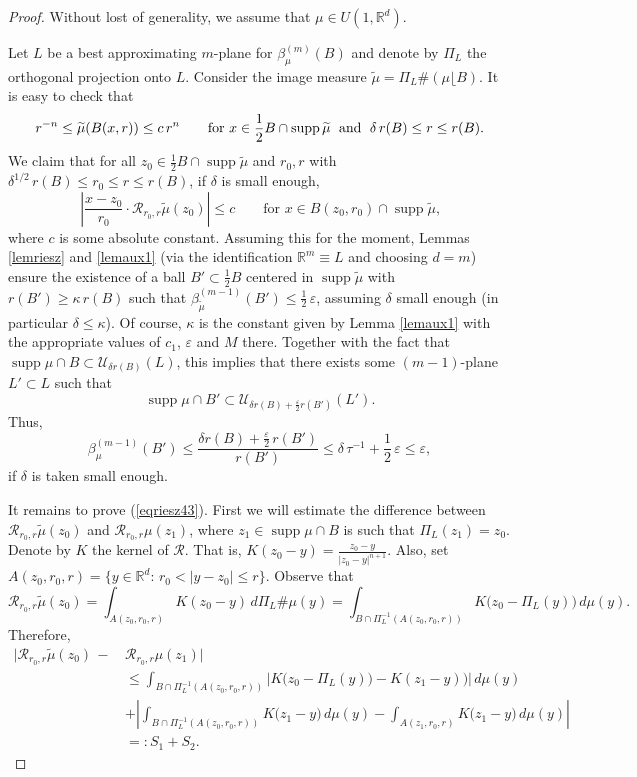 \documentclass[11pt]{amsart}
\newcommand{\R}{{\mathbb R}}       %
\newcommand{\UU}{{\mathcal U}}
\newcommand{\RR}{{\mathcal R}}
\newcommand{\rf}[1]{{(\ref{#1})}}
\newcommand{\supp}{\operatorname{supp}}
\newcommand{\ve}{{\varepsilon}}
\newcommand{\wt}[1]{{\widetilde{#1}}}
\newcommand{\rest}{{\lfloor}}
\theoremstyle{definition}
\theoremstyle{remark}
\numberwithin{equation}{section}
\begin{document}
\begin{proof}
Without lost of generality, we assume that $\mu\in U(1,\R^d)$. 

Let $L$ be a best approximating $m$-plane for $\beta_\mu^{(m)}(B)$ and denote by $\Pi_L$ the orthogonal projection onto $L$.
Consider the image measure $\wt\mu = \Pi_L\#(\mu\rest B)$.
It is easy to check that
$$r^{-n}\leq \wt\mu(B(x,r))\leq c\,r^n\qquad \mbox{for $x\in \dfrac12 B\cap \supp\wt\mu$\; and\;
$\delta\,r(B)\leq r\leq r(B)$.}$$
We claim that for all $z_0\in\frac12 B\cap \supp\wt\mu$ and $r_0,r$ with
$\delta^{1/2}\,r(B)\leq r_0\leq r\leq r(B)$, if $\delta$ is small enough,
\begin{equation}\label{eqriesz43}
\left|\frac{x-z_0}{r_0}\cdot\RR_{r_0,r}\wt \mu(z_0)\right|\leq c \qquad\mbox{for $x\in B(z_0,r_0)\cap\supp\wt
\mu$,}
\end{equation}
where $c$ is some absolute constant. Assuming this for the moment, Lemmas \ref{lemriesz} and \ref{lemaux1} (via the identification $\R^m\equiv L$
and choosing $d=m$) ensure the existence of a ball
$B'\subset \frac12 B$ centered in $\supp\wt\mu$ with $r(B')\geq\kappa \,r(B)$ such that 
$\beta^{(m-1)}_{\wt\mu}(B')\leq
\frac12\,\ve$, assuming $\delta$ small enough (in particular $\delta\leq\kappa$). Of course, $\kappa$ is the constant given by Lemma \ref{lemaux1} with the appropriate values of $c_1$, $\ve$ and $M$ there. Together with the fact that $\supp\mu\cap B\subset \UU_{\delta r(B)}(L)$, this implies that
there exists some $(m-1)$-plane $L'\subset L$ such that
$$\supp\mu\cap B'\subset \UU_{\delta r(B) + \frac\ve2 r(B')}(L').$$
Thus,
$$\beta^{(m-1)}_\mu(B') \leq \frac{\delta r(B) + \frac\ve2\, r(B')}{r(B')} \leq \delta\,\tau^{-1} + \frac12\,\ve
\leq\ve,$$
if $\delta$ is taken small enough.

It remains to prove \rf{eqriesz43}. First we will estimate the difference between $\RR_{r_0,r}\wt\mu(z_0)$ and
$\RR_{r_0,r}\mu(z_1)$, where $z_1\in\supp\mu\cap B$ is such that $\Pi_L(z_1)=z_0$. Denote by $K$ the kernel
of $\RR$. That is, $K(z_0-y) =\frac{z_0-y}{|z_0-y|^{n+1}}$. Also, set 
$A(z_0,r_0,r)= \{y\in\R^d:\,r_0<|y-z_0|\leq r\}$. Observe that
$$\RR_{r_0,r}\wt\mu(z_0) = \int_{A(z_0,r_0,r)} \!\!K(z_0-y)\,d\Pi_L\#\mu(y) =
 \int_{B\cap \Pi_L^{-1}(A(z_0,r_0,r))}\!\! K\bigl(z_0-\Pi_L(y)\bigr)\,d\mu(y).$$
Therefore,
\begin{align*}
\bigl|\RR_{r_0,r}\wt\mu(z_0) \,-\, &\RR_{r_0,r}\mu(z_1)\bigr|\\ &\leq
\int_{B\cap \Pi_L^{-1}(A(z_0,r_0,r))}\!\! \bigl|K\bigl(z_0-\Pi_L(y)\bigr)
- K(z_1-y))\bigr|\,d\mu(y)\\
& +
\left|\int_{B\cap \Pi_L^{-1}(A(z_0,r_0,r))}K\bigl(z_1-y)\,d\mu(y) -
\int_{A(z_1,r_0,r)}K\bigl(z_1-y)\,d\mu(y)\right|\\
& =: S_1 + S_2.
\end{align*}


\end{proof}
\end{document}
